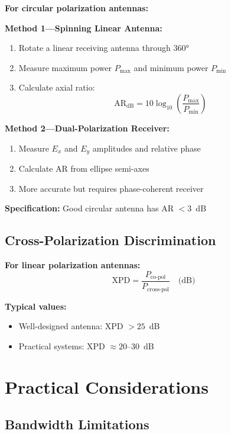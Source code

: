 \begin{center}
\textbf{For circular polarization antennas:}

\textbf{Method 1---Spinning Linear Antenna:}
\begin{enumerate}
\item Rotate a linear receiving antenna through $360°$
\item Measure maximum power $P_{\text{max}}$ and minimum power $P_{\text{min}}$
\item Calculate axial ratio:
\begin{equation}
\mathrm{AR}_{\text{dB}} = 10\log_{10}\left(\frac{P_{\text{max}}}{P_{\text{min}}}\right)
\label{eq:ar-measurement}
\end{equation}
\end{enumerate}

\textbf{Method 2---Dual-Polarization Receiver:}
\begin{enumerate}
\item Measure $E_x$ and $E_y$ amplitudes and relative phase
\item Calculate AR from ellipse semi-axes
\item More accurate but requires phase-coherent receiver
\end{enumerate}

\textbf{Specification:} Good circular antenna has AR $< 3$~dB

\subsection{Cross-Polarization Discrimination}

\textbf{For linear polarization antennas:}
\begin{equation}
\mathrm{XPD} = \frac{P_{\text{co-pol}}}{P_{\text{cross-pol}}} \quad \text{(dB)}
\end{equation}

\textbf{Typical values:}
\begin{itemize}
\item Well-designed antenna: XPD $> 25$~dB
\item Practical systems: XPD $\approx 20$--30~dB
\end{itemize}

\section{Practical Considerations}

\subsection{Bandwidth Limitations}


\end{center}

